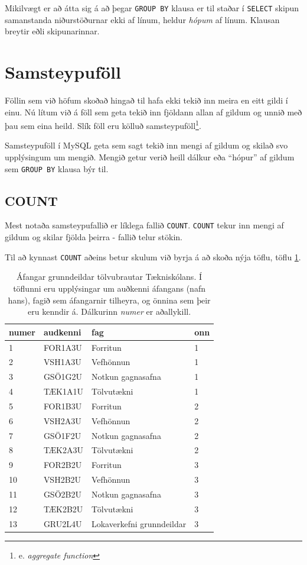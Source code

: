 Mikilvægt er að átta sig á að þegar \verb|GROUP BY| klausa er til staðar í \verb|SELECT| skipun samanstanda niðurstöðurnar ekki af línum, heldur \emph{hópum} af línum. Klausan breytir eðli skipunarinnar. 

\section{Samsteypuföll}
Föllin sem við höfum skoðað hingað til hafa ekki tekið inn meira en eitt gildi í einu. Nú lítum við á föll sem geta tekið inn fjöldann allan af gildum og unnið með þau sem eina heild. Slík föll eru kölluð samsteypuföll\footnote{e. \emph{aggregate function}}.

Samsteypuföll í MySQL geta sem sagt tekið inn mengi af gildum og skilað svo upplýsingum um mengið. Mengið getur verið heill dálkur eða ``hópur'' af gildum sem \verb|GROUP BY| klausa býr til.

\subsection{COUNT}
Mest notaða samsteypufallið er líklega fallið \verb|COUNT|. \verb|COUNT| tekur inn mengi af gildum og skilar fjölda þeirra - fallið telur stökin.

Til að kynnast \verb|COUNT| aðeins betur skulum við byrja á að skoða nýja töflu, töflu \ref{tafla:afangar}.

\begin{table}
\centering
\caption[Áfangar]{Áfangar grunndeildar tölvubrautar Tækniskólans. Í töflunni eru upplýsingar um auðkenni áfangans (nafn hans), fagið sem áfangarnir tilheyra, og önnina sem þeir eru kenndir á. Dálkurinn \emph{numer} er aðallykill.}
\label{tafla:afangar}
\begin{tabular}{llll}
\toprule
numer&audkenni&fag&onn\\
\midrule
1&	FOR1A3U&	Forritun&		1\\
2&	VSH1A3U&	Vefhönnun&		1\\
3&	GSÖ1G2U&	Notkun gagnasafna&	1\\
4&	TÆK1A1U&	Tölvutækni&		1\\
5&	FOR1B3U&	Forritun&		2\\
6&	VSH2A3U&	Vefhönnun&		2\\
7&	GSÖ1F2U&	Notkun gagnasafna&	2\\
8&	TÆK2A3U&	Tölvutækni&		2\\
9&	FOR2B2U&	Forritun&		3\\
10&	VSH2B2U&	Vefhönnun&		3\\
11&	GSÖ2B2U&	Notkun gagnasafna&	3\\
12&	TÆK2B2U&	Tölvutækni&		3\\
13&	GRU2L4U&	Lokaverkefni grunndeildar&3\\
\bottomrule
\end{tabular}
\end{table}

